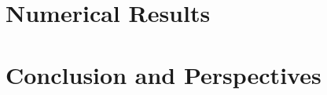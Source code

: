 \documentclass[11pt,a4paper]{article}
\numberwithin{equation}{section}
\begin{document}
\section{Numerical Results}



\section{Conclusion and Perspectives}





\pagebreak


\end{document}
